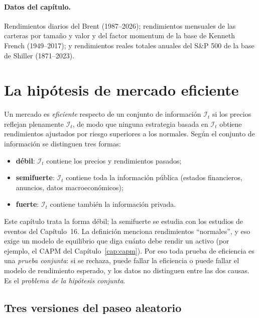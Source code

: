\paragraph{Datos del capítulo.} Rendimientos diarios del Brent (1987--2026); rendimientos mensuales de las
carteras por tamaño y valor y del factor momentum de la base de Kenneth French (1949--2017); y rendimientos
reales totales anuales del S\&P 500 de la base de Shiller (1871--2023).

\section{La hipótesis de mercado eficiente}

\begin{definicion}
Un mercado es \emph{eficiente} respecto de un conjunto de información $\mathcal I_t$ si los precios reflejan
plenamente $\mathcal I_t$, de modo que ninguna estrategia basada en $\mathcal I_t$ obtiene rendimientos
ajustados por riesgo superiores a los normales. Según el conjunto de información se distinguen tres formas:
\begin{itemize}[leftmargin=*]
  \item \textbf{débil}: $\mathcal I_t$ contiene los precios y rendimientos pasados;
  \item \textbf{semifuerte}: $\mathcal I_t$ contiene toda la información pública (estados financieros,
        anuncios, datos macroeconómicos);
  \item \textbf{fuerte}: $\mathcal I_t$ contiene también la información privada.
\end{itemize}
\end{definicion}

Este capítulo trata la forma débil; la semifuerte se estudia con los estudios de eventos del
Capítulo~16. La definición menciona rendimientos ``normales'', y eso exige un modelo de equilibrio que diga
cuánto debe rendir un activo (por ejemplo, el CAPM del Capítulo~\ref{cap:capm}). Por eso toda prueba de
eficiencia es una \emph{prueba conjunta}: si se rechaza, puede fallar la eficiencia o puede fallar el modelo de
rendimiento esperado, y los datos no distinguen entre las dos causas. Es el \emph{problema de la hipótesis
conjunta}.

\subsection{Tres versiones del paseo aleatorio}

